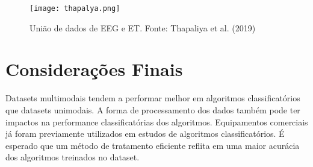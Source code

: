 

\begin{figure}[h]
      \centering
      \texttt{[image: thapalya.png]}
      \caption{União de dados de EEG e ET. Fonte: Thapaliya et al. (2019)}
\end{figure}

\section{Considerações Finais}
Datasets multimodais tendem a performar melhor em algoritmos classificatórios que datasets unimodais. 
A forma de processamento dos dados também pode ter impactos na performance classificatórias dos algoritmos. 
Equipamentos comerciais já foram previamente utilizados em estudos de algoritmos classificatórios. 
É esperado que um método de tratamento eficiente reflita em uma maior acurácia dos algoritmos treinados no dataset. 

